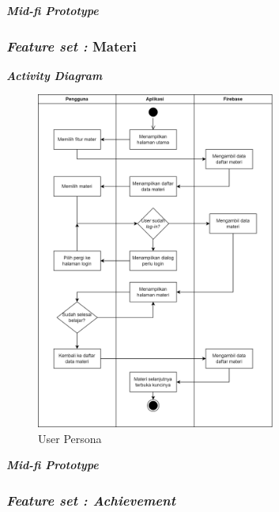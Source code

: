 \textbf{\textit{Mid-fi Prototype}}

\subsubsection{\textit{Feature set :} Materi}

\textbf{\textit{Activity Diagram}}
\begin{figure}[H]
	\centering
	\includegraphics[width=0.7\textwidth]{contents/chapter-3/images/AD-materi.png}
	\caption[Caption]{User Persona}
	\label{Fig:UserPersona}
\end{figure}

\textbf{\textit{Mid-fi Prototype}}

\subsubsection{\textit{Feature set : Achievement}}

